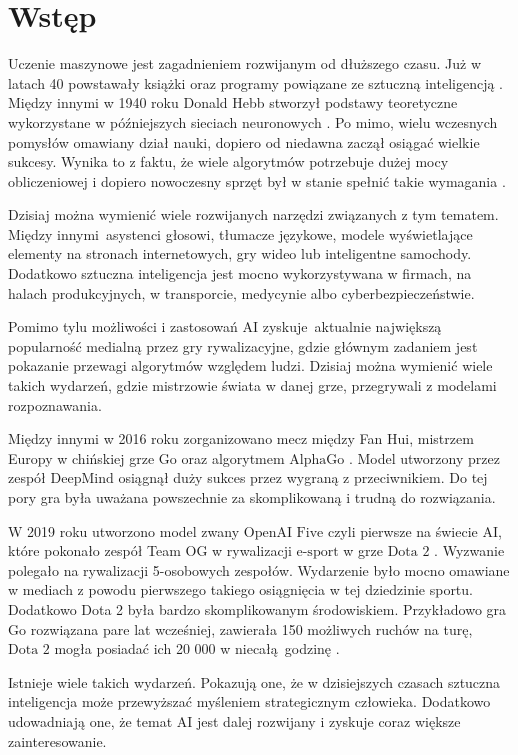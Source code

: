 \documentclass[12pt,oneside,a4paper]{report}
\begin{document}
\chapter{Wstęp}

Uczenie maszynowe jest zagadnieniem rozwijanym od dłuższego czasu.
Już w latach 40 powstawały książki oraz programy powiązane ze sztuczną inteligencją \cite{hist AI}. 
Między innymi w 1940 roku Donald Hebb stworzył podstawy teoretyczne wykorzystane w 
późniejszych sieciach neuronowych \cite{hist AI}. Po mimo, wielu wczesnych pomysłów omawiany dział
nauki,
dopiero od niedawna zaczął osiągać wielkie sukcesy. Wynika to z faktu, że wiele algorytmów
potrzebuje
dużej mocy obliczeniowej  
i dopiero nowoczesny sprzęt był w stanie spełnić takie wymagania \cite{hist AI}.

Dzisiaj można wymienić wiele rozwijanych narzędzi związanych z tym tematem.
Między innymi asystenci głosowi, tłumacze językowe, modele wyświetlające elementy na
stronach internetowych, gry wideo lub inteligentne samochody.
Dodatkowo sztuczna inteligencja jest mocno wykorzystywana w firmach,
na halach produkcyjnych, w transporcie, medycynie albo cyberbezpieczeństwie. 


Pomimo tylu możliwości i zastosowań AI zyskuje aktualnie największą 
popularność
medialną przez gry rywalizacyjne, gdzie głównym zadaniem jest pokazanie przewagi 
algorytmów względem
ludzi. Dzisiaj można wymienić wiele takich wydarzeń, gdzie 
mistrzowie świata w danej grze, przegrywali z modelami rozpoznawania. 


Między innymi w 2016 roku zorganizowano
mecz między Fan Hui, mistrzem Europy w chińskiej grze $\text{Go}$ oraz algorytmem
$\text{AlphaGo}$ \cite{Go}.
Model utworzony przez zespół $\text{DeepMind}$ osiągnął duży sukces przez wygraną z przeciwnikiem.
Do tej pory gra była uważana powszechnie za skomplikowaną i trudną do rozwiązania.

W 2019 roku utworzono model zwany $\text{OpenAI Five}$ czyli pierwsze na świecie AI, które pokonało
zespół Team OG w rywalizacji $\text{e-sport}$ w grze $\text{Dota 2}$ \cite{Dota2}. Wyzwanie polegało
na rywalizacji 5-osobowych
zespołów.
Wydarzenie było mocno omawiane w mediach z powodu pierwszego takiego osiągnięcia w tej dziedzinie
sportu. 
Dodatkowo Dota 2 była bardzo skomplikowanym środowiskiem.
Przykładowo gra $\text{Go}$ rozwiązana pare lat wcześniej, zawierała 150 możliwych ruchów na turę, 
$\text{Dota 2}$
mogła posiadać ich 20 000 w niecałą godzinę \cite{Dota2}.


Istnieje wiele takich wydarzeń. Pokazują one, że w dzisiejszych 
czasach sztuczna inteligencja może przewyższać myśleniem strategicznym człowieka. Dodatkowo 
udowadniają one, że
temat AI jest dalej rozwijany i zyskuje coraz większe zainteresowanie.   
\end{document}
